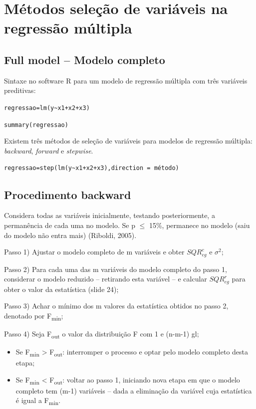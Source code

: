 \documentclass[12pt,brazil,]{book}
\begin{document}
\hypertarget{metodos-selecao-de-variaveis-na-regressao-multipla}{%
\section{Métodos seleção de variáveis na regressão
múltipla}\label{metodos-selecao-de-variaveis-na-regressao-multipla}}

\hypertarget{full-model-modelo-completo}{%
\subsection{Full model -- Modelo
completo}\label{full-model-modelo-completo}}

Sintaxe no software R para um modelo de regressão múltipla com três
variáveis preditivas:

\texttt{regressao=lm(y\textasciitilde{}x1+x2+x3)}

\texttt{summary(regressao)}

Existem três métodos de seleção de variáveis para modelos de regressão
múltipla: \emph{backward}, \emph{forward} e \emph{stepwise}.

\texttt{regressao=step(lm(y\textasciitilde{}x1+x2+x3),direction\ =\ \textquotesingle{}método\textquotesingle{})}

\hypertarget{procedimento-backward}{%
\subsection{Procedimento backward}\label{procedimento-backward}}

Considera todas as variáveis inicialmente, testando posteriormente, a
permanência de cada uma no modelo. Se p \(\leq\) 15\%, permanece no
modelo (saiu do modelo não entra mais) (Riboldi, 2005).

Passo 1) Ajustar o modelo completo de m variáveis e obter
\(SQR^{c}_{eg}\) e \(\sigma^{2}\);

Passo 2) Para cada uma das m variáveis do modelo completo do passo 1,
considerar o modelo reduzido -- retirando esta variável -- e calcular
\(SQR^{r}_{eg}\) para obter o valor da estatística (slide 24);

Passo 3) Achar o mínimo dos m valores da estatística obtidos no passo 2,
denotado por F\textsubscript{min};

Passo 4) Seja F\textsubscript{out} o valor da distribuição F com 1 e
(n-m-1) gl;

\begin{itemize}
\item
  Se F\textsubscript{min} \textgreater{} F\textsubscript{out}:
  interromper o processo e optar pelo modelo completo desta etapa;
\item
  Se F\textsubscript{min} \textless{} F\textsubscript{out}: voltar ao
  passo 1, iniciando nova etapa em que o modelo completo tem (m-1)
  variáveis -- dada a eliminação da variável cuja estatística é igual a
  F\textsubscript{min}.
\end{itemize}
\end{document}
